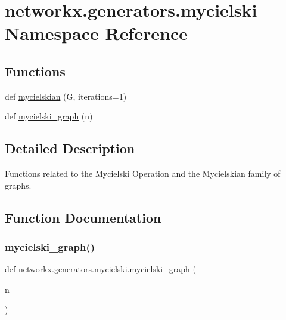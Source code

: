 \hypertarget{namespacenetworkx_1_1generators_1_1mycielski}{}\section{networkx.\+generators.\+mycielski Namespace Reference}
\label{namespacenetworkx_1_1generators_1_1mycielski}
\subsection*{Functions}
\begin{DoxyCompactItemize}
\item 
def \hyperlink{namespacenetworkx_1_1generators_1_1mycielski_ade7783c9254474cee45d70c1dbc56a48}{mycielskian} (G, iterations=1)
\item 
def \hyperlink{namespacenetworkx_1_1generators_1_1mycielski_a35b570e92e31826d64bcbf6c56e7b08c}{mycielski\+\_\+graph} (n)
\end{DoxyCompactItemize}


\subsection{Detailed Description}
\begin{DoxyVerb}Functions related to the Mycielski Operation and the Mycielskian family
of graphs.\end{DoxyVerb}
 

\subsection{Function Documentation}
\mbox{\label{namespacenetworkx_1_1generators_1_1mycielski_a35b570e92e31826d64bcbf6c56e7b08c}} 
\subsubsection{\texorpdfstring{mycielski\+\_\+graph()}{mycielski\_graph()}}
{\footnotesize\ttfamily def networkx.\+generators.\+mycielski.\+mycielski\+\_\+graph (\begin{DoxyParamCaption}\item[{}]{n }\end{DoxyParamCaption})}

